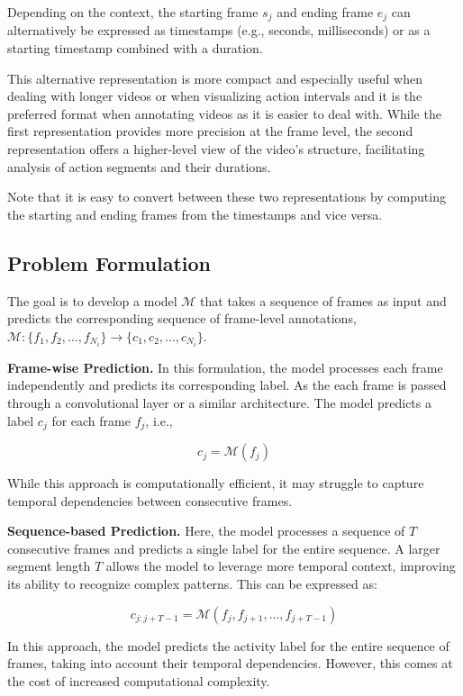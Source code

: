 Depending on the context, the starting frame $s_j$ and ending frame $e_j$ can alternatively be expressed as timestamps (e.g., seconds, milliseconds) or as a starting timestamp combined with a duration. 

This alternative representation is more compact and especially useful when dealing with longer videos or when visualizing action intervals and it is the preferred format when annotating videos as it is easier to deal with. While the first representation provides more precision at the frame level, the second representation offers a higher-level view of the video’s structure, facilitating analysis of action segments and their durations.

Note that it is easy to convert between these two representations by computing the starting and ending frames from the timestamps and vice versa.

\subsection{Problem Formulation}
The goal is to develop a model $\mathcal{M}$ that takes a sequence of frames as input and predicts the corresponding sequence of frame-level annotations, $\mathcal{M}: \{f_1, f_2, \dots, f_{N_i}\} \rightarrow \{c_1, c_2, \dots, c_{N_i}\}$.

\noindent\textbf{Frame-wise Prediction.}  
In this formulation, the model processes each frame independently and predicts its corresponding label. As the each frame is passed through a convolutional layer or a similar architecture. The model predicts a label $c_j$ for each frame $f_j$, i.e.,

\[
c_j = \mathcal{M}(f_j)
\]

While this approach is computationally efficient, it may struggle to capture temporal dependencies between consecutive frames.

\noindent\textbf{Sequence-based Prediction.}  
Here, the model processes a sequence of $T$ consecutive frames and predicts a single label for the entire sequence. A larger segment length $T$ allows the model to leverage more temporal context, improving its ability to recognize complex patterns. This can be expressed as:

\[
c_{j:j+T-1} = \mathcal{M}(f_j, f_{j+1}, \dots, f_{j+T-1})
\]

In this approach, the model predicts the activity label for the entire sequence of frames, taking into account their temporal dependencies. However, this comes at the cost of increased computational complexity.

